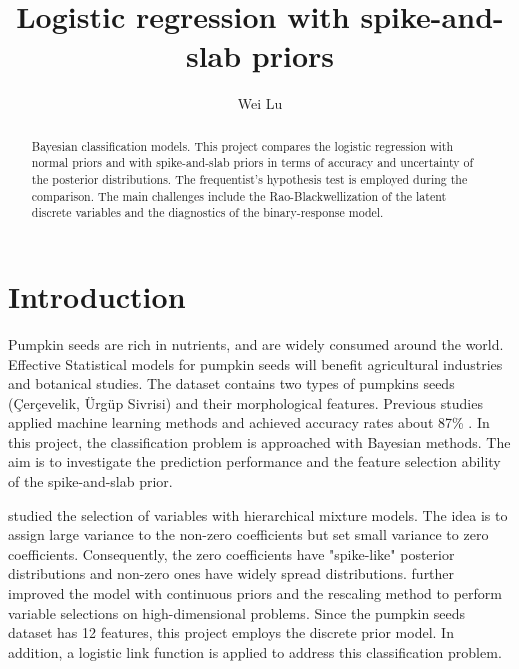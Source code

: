 \documentclass[12pt]{article}
\begin{document}
\title{\vspace{-2cm}Logistic regression with spike-and-slab priors} 
\author{\vspace{-2cm}Wei Lu}
\date{} %
\maketitle %


\begin{abstract}
Bayesian classification models. This project compares the logistic regression 
with normal priors and with spike-and-slab priors in terms of accuracy and uncertainty
of the posterior distributions. The frequentist's hypothesis test is employed during the comparison. The main challenges include the Rao-Blackwellization of the latent discrete
variables and the diagnostics of the binary-response model.

\end{abstract}


\section{Introduction}
Pumpkin seeds are rich in nutrients, and are widely consumed around the world. Effective Statistical models for pumpkin seeds will benefit agricultural industries and botanical studies. The dataset contains two types of pumpkins seeds (Çerçevelik, Ürgüp Sivrisi) and their morphological features. Previous studies applied machine learning methods and achieved accuracy rates about 87\% \citep{pumpkin}. In this project, the classification problem is approached with Bayesian methods. The aim is to investigate the prediction performance and the feature selection ability of the spike-and-slab prior.

\noindent\citet{selection} studied the selection of variables with hierarchical mixture models. The idea is to assign large variance to the non-zero coefficients but set small variance to zero coefficients. Consequently, the zero coefficients have "spike-like" posterior distributions and non-zero ones have widely spread distributions. \citet{sas} further improved the model with continuous priors and the rescaling method to perform variable selections on high-dimensional problems. Since the pumpkin seeds dataset has 12 features, this project employs the discrete prior model. In addition, a logistic link function is applied to address this classification problem.
\end{document}
